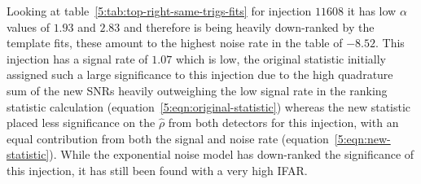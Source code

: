 Looking at table~\ref{5:tab:top-right-same-trigs-fits} for injection $11608$ it has low $\alpha$ values of $1.93$ and $2.83$ and therefore is being heavily down-ranked by the template fits, these amount to the highest noise rate in the table of $-8.52$. This injection has a signal rate of $1.07$ which is low, the original statistic initially assigned such a large significance to this injection due to the high quadrature sum of the new SNRs heavily outweighing the low signal rate in the ranking statistic calculation (equation~\ref{5:eqn:original-statistic}) whereas the new statistic placed less significance on the $\hat{\rho}$ from both detectors for this injection, with an equal contribution from both the signal and noise rate (equation~\ref{5:eqn:new-statistic}). While the exponential noise model has down-ranked the significance of this injection, it has still been found with a very high IFAR.

